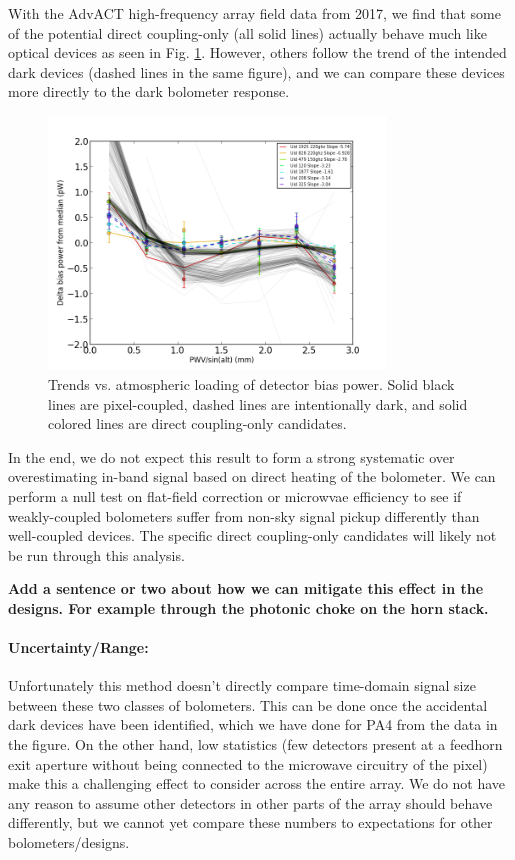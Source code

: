 With the AdvACT high-frequency array field data from 2017, we find that some of the potential direct coupling-only (all solid lines) actually behave much like optical devices as seen in Fig. \ref{direct_pickup_PA4}. However, others follow the trend of the intended dark devices (dashed lines in the same figure), and we can compare these devices more directly to the dark bolometer response.

\begin{figure}[h!]
\centering
\includegraphics[width=0.8\textwidth]{figures/pickup_test.png}
\caption{Trends vs. atmospheric loading of detector bias power. Solid black lines are pixel-coupled, dashed lines are intentionally dark, and solid colored lines are direct coupling-only candidates.}
\label{direct_pickup_PA4}
\end{figure}

In the end, we do not expect this result to form a strong systematic over overestimating in-band signal based on direct heating of the bolometer. We can perform a null test on flat-field correction or microwvae efficiency to see if weakly-coupled bolometers suffer from non-sky signal pickup differently than well-coupled devices. The specific direct coupling-only candidates will likely not be run through this analysis.

\textbf{Add a sentence or two about how we can mitigate this effect in the designs. For example through the photonic choke on the horn stack.}

\paragraph{Uncertainty/Range:}
Unfortunately this method doesn't directly compare time-domain signal size between these two classes of bolometers. This can be done once the accidental dark devices have been identified, which we have done for PA4 from the data in the figure. On the other hand, low statistics (few detectors present at a feedhorn exit aperture without being connected to the microwave circuitry of the pixel) make this a challenging effect to consider across the entire array. We do not have any reason to assume other detectors in other parts of the array should behave differently, but we cannot yet compare these numbers to expectations for other bolometers/designs.

